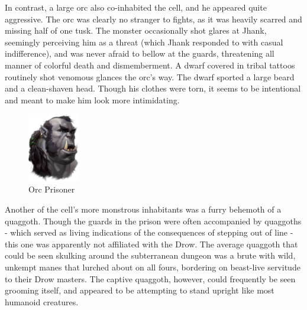 \documentclass[letterpaper,10pt,twoside,twocolumn,openany]{book}
\begin{document}
In contrast, a large orc also co-inhabited the cell, and he appeared quite aggressive. The orc was clearly no stranger to fights, as it was heavily scarred and missing half of one tusk. The monster occasionally shot glares at Jhank, seemingly perceiving him as a threat (which Jhank responded to with casual indifference), and was never afraid to bellow at the guards, threatening all manner of colorful death and dismemberment. A dwarf covered in tribal tattoos routinely shot venomous glances the orc's way. The dwarf sported a large beard and a clean-shaven head. Though his clothes were torn, it seems to be intentional and meant to make him look more intimidating.\\
\begin{figure}[H]
	\centering
	\includegraphics[width=0.2\textwidth]{img/dist/orc-prisoner.png}
	\caption{Orc Prisoner\label{fig:orcPrisoner}}
\end{figure}

Another of the cell's more monstrous inhabitants was a furry behemoth of a quaggoth. Though the guards in the prison were often accompanied by quaggoths - which served as living indications of the consequences of stepping out of line - this one was apparently not affiliated with the Drow. The average quaggoth that could be seen skulking around the subterranean dungeon was a brute with wild, unkempt manes that lurched about on all fours, bordering on beast-live servitude to their Drow masters. The captive quaggoth, however, could frequently be seen grooming itself, and appeared to be attempting to stand upright like most humanoid creatures.\\
\end{document}
